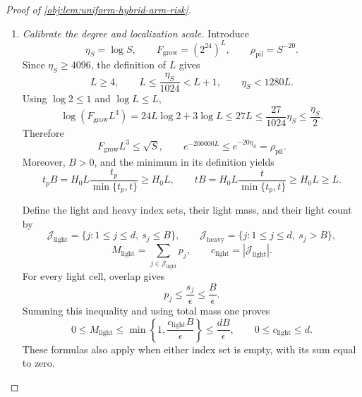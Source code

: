 \begin{proof}[Proof of \cref{obj:lem:uniform-hybrid-arm-risk}]
\begin{enumerate}
\item \textit{Calibrate the degree and localization scale.}
Introduce
\[
\eta_S=\log S,\qquad
F_{\mathrm{grow}}=(2^{24})^L,\qquad
\rho_{\mathrm{pil}}=S^{-20}.
\]
Since \(\eta_S\ge4096\), the definition of \(L\) gives
\[
L\ge4,\qquad
L\le\frac{\eta_S}{1024}<L+1,\qquad
\eta_S<1280L.
\]
Using \(\log2\le1\) and \(\log L\le L\),
\[
\log(F_{\mathrm{grow}}L^3)
=24L\log2+3\log L
\le27L
\le\frac{27}{1024}\eta_S
\le\frac{\eta_S}{2}.
\]
Therefore
\[
F_{\mathrm{grow}}L^3\le\sqrt S,
\qquad
e^{-200000L}\le e^{-20\eta_S}=\rho_{\mathrm{pil}}.
\]
Moreover, \(B>0\), and the minimum in its definition yields
\[
t_pB
=H_0L\frac{t_p}{\min\{t_p,t\}}\ge H_0L,
\qquad
tB
=H_0L\frac{t}{\min\{t_p,t\}}\ge H_0L\ge L.
\]

Define the light and heavy index sets, their light mass, and their light count by
\[
\mathcal J_{\mathrm{light}}=\{j:1\le j\le d,\ s_j\le B\},
\qquad
\mathcal J_{\mathrm{heavy}}=\{j:1\le j\le d,\ s_j>B\},
\]
\[
M_{\mathrm{light}}=\sum_{j\in\mathcal J_{\mathrm{light}}}p_j,
\qquad
c_{\mathrm{light}}=|\mathcal J_{\mathrm{light}}|.
\]
For every light cell, overlap gives
\[
p_j\le\frac{s_j}{\epsilon}\le\frac B\epsilon.
\]
Summing this inequality and using total mass one proves
\[
0\le M_{\mathrm{light}}
\le\min\left\{1,\frac{c_{\mathrm{light}}B}{\epsilon}\right\}
\le\frac{dB}{\epsilon},
\qquad
0\le c_{\mathrm{light}}\le d.
\]
These formulas also apply when either index set is empty, with its sum equal to zero.


\end{enumerate}
\end{proof}
